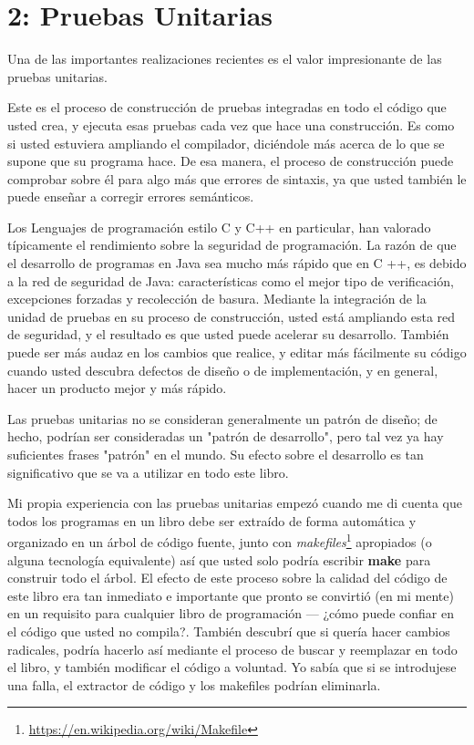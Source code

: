 \section*{2: Pruebas Unitarias}
\label{sec:pu}

\large Una de las  importantes realizaciones recientes es el valor impresionante de las pruebas unitarias.   \newline

Este es el proceso de construcción de pruebas integradas en todo el código que usted crea, y ejecuta esas pruebas cada vez que hace una construcción.
Es como si usted estuviera ampliando el compilador, diciéndole más acerca de lo que se supone que su programa hace. De esa manera, el proceso de construcción puede comprobar sobre él para algo más que errores de sintaxis, ya que usted también le puede enseñar a corregir errores semánticos. \newline

Los Lenguajes de programación estilo C y C++ en particular, han valorado típicamente el rendimiento sobre la seguridad de programación. La razón de que el desarrollo de programas en Java sea mucho más rápido que en C ++, es debido a la red de seguridad de Java: características como el mejor tipo de verificación, excepciones forzadas y recolección de basura. 
Mediante la integración de la unidad de pruebas en su proceso de construcción, usted está ampliando esta red de seguridad, y el resultado es que usted puede acelerar su desarrollo. También puede ser más audaz en los cambios que realice, y editar más fácilmente su código cuando usted descubra defectos de diseño o de implementación, y en general, hacer un producto mejor y más rápido. \newline

Las pruebas unitarias no se consideran generalmente un patrón de diseño; de hecho, podrían ser consideradas un "patrón de desarrollo", pero tal vez ya hay suficientes frases "patrón" en el mundo. 
Su efecto sobre el desarrollo es tan significativo que se va a utilizar en todo este libro.   \newline

Mi propia experiencia con las pruebas unitarias empezó cuando me di cuenta que todos los programas en un libro debe ser extraído de forma automática y organizado en un árbol de código fuente, junto con \textit{makefiles}\footnote{ \url{https://en.wikipedia.org/wiki/Makefile} } apropiados (o alguna tecnología equivalente) así que usted solo podría escribir \textbf{make} para construir todo el árbol.
El efecto de este proceso sobre la calidad del código de este libro era tan inmediato e importante que pronto se convirtió (en mi mente) en un requisito para cualquier libro de programación — ¿cómo puede confiar en el código que usted no compila?. También descubrí que si quería hacer cambios radicales, podría hacerlo así mediante el proceso de buscar y reemplazar en todo el libro, y también modificar el código a voluntad. Yo sabía que si se introdujese una falla, el extractor de código y los makefiles podrían eliminarla.     \newline


